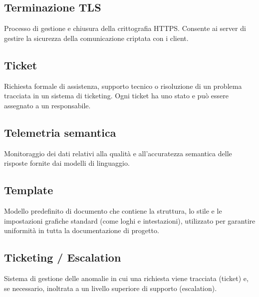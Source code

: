 \documentclass[a4paper, 11pt, oneside]{scrartcl} %
\begin{document}
\subsection*{Terminazione TLS}


Processo di gestione e chiusura della crittografia HTTPS. Consente ai server di gestire la sicurezza della comunicazione criptata con i client.

\vspace{0.5cm}

\subsection*{Ticket}


Richiesta formale di assistenza, supporto tecnico o risoluzione di un problema tracciata in un sistema di ticketing. Ogni ticket ha uno stato e può essere assegnato a un responsabile.

\vspace{0.5cm}

\subsection*{Telemetria semantica}
Monitoraggio dei dati relativi alla qualità e all'accuratezza semantica delle risposte fornite dai modelli di linguaggio.
\vspace{0.5cm}

\subsection*{Template}
Modello predefinito di documento che contiene la struttura, lo stile e le impostazioni grafiche standard (come loghi e intestazioni), utilizzato per garantire uniformità in tutta la documentazione di progetto.
\vspace{0.5cm}

\subsection*{Ticketing / Escalation}
Sistema di gestione delle anomalie in cui una richiesta viene tracciata (ticket) e, se necessario, inoltrata a un livello superiore di supporto (escalation).
\vspace{0.5cm}
\end{document}
